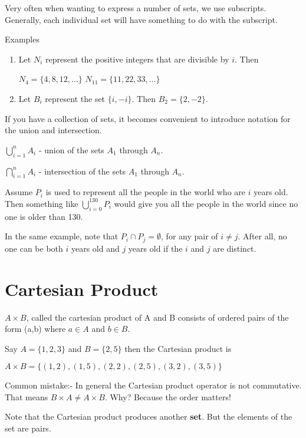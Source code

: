 \documentclass[12pt]{article}
\begin{document}
Very often when wanting to express a number of sets, we use subscripts. 
Generally, each individual set will have something to do with the subscript.

Examples

\begin{enumerate}
\item Let $N_i$ represent the positive integers that are divisible by $i$. Then

$N_4 = \{4,8,12,\ldots\}$
$N_{11} = \{11, 22, 33, \ldots\}$

\item Let $B_i$ represent the set $\{i,-i\}$. Then $B_2 = \{2,-2\}$.
\end{enumerate}

If you have a collection of sets, it becomes convenient to introduce notation for the union and intersection.

$\displaystyle \bigcup_{i=1}^n A_i$ - union of the sets $A_1$ through $A_n$.

$\displaystyle \bigcap_{i=1}^n A_i$ - intersection of the sets $A_1$ through $A_n$.

Assume $P_i$ is used to represent all the people in the world who are $i$ years old. 
Then something like $\displaystyle \bigcup_{i=0}^{130} P_i$ would give you all the people in the world since no one is older than 130. 

In the same example, note that $P_i \cap P_j = \emptyset$, for any pair of $i \neq j$. After all, no one can be both $i$ years old and $j$ years old if the $i$ and $j$ are distinct.

\section*{Cartesian Product}

$A \times B$, called the cartesian product of A and B consists of ordered pairs of the form (a,b) where $a \in A$ and $b \in B$.

Say $A = \{1,2,3\}$ and $B = \{2,5\}$ then the Cartesian product is

$A \times B = \{(1,2), (1,5), (2,2), (2,5), (3,2), (3,5)\}$ 

Common mistake:- In general the Cartesian product operator is not commutative. That means $B \times A \neq A \times B$. Why? Because the order matters!

Note that the Cartesian product produces another {\bf set}. But the elements of the set are pairs. 

\medskip
\end{document}
